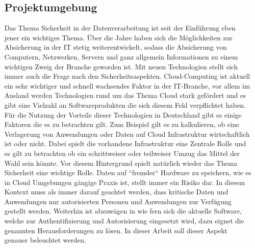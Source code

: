 \documentclass[
a4paper,   
titlepage,  
halfparskip,
12pt        
]{scrartcl}
\begin{document}
\begin{onehalfspacing}
\subsection{Projektumgebung}
Das Thema Sicherheit in der Datenverarbeitung ist seit der Einführung eben jener ein wichtiges Thema. Über die Jahre haben sich die Möglichkeiten zur Absicherung in der \ac{IT} stetig weiterentwickelt, sodass die Absicherung von Computern, Netzwerken, Servern und ganz allgemein Informationen zu einem wichtigen Zweig der Branche geworden ist. Mit neuen Technologien stellt sich immer auch die Frage nach den Sicherheitsaspekten.\newline
Cloud-Computing ist aktuell ein sehr wichtiger und schnell wachsendes Faktor in der \ac{IT}-Branche, vor allem im Ausland werden Technologien rund um das Thema Cloud stark gefördert und es gibt eine Vielzahl an Softwareprodukten die sich diesem Feld verpflichtet haben. Für die Nutzung der Vorteile dieser Technologien in Deutschland gibt es einige Faktoren die es zu betrachten gilt. Zum Beispiel gilt es zu kalkulieren, ob eine Verlagerung von Anwendungen oder Daten auf Cloud Infrastruktur wirtschaftlich ist oder nicht. Dabei spielt die vorhandene Infrastruktur eine Zentrale Rolle und es gilt zu betrachten ob ein schrittweiser oder teilweiser Umzug das Mittel der Wahl sein könnte. Vor diesem Hintergrund spielt natürlich wieder das Thema Sicherheit eine wichtige Rolle. Daten auf ``fremder`` Hardware zu speichern, wie es in Cloud Umgebungen gängige Praxis ist, stellt immer ein Risiko dar. In diesem Kontext muss als immer darauf geachtet werden, dass kritische Daten und Anwendungen nur autorisierten Personen und Anwendungen zur Verfügung gestellt werden. Weiterhin ist abzuwägen in wie fern sich die aktuelle Software, welche zur Authentifizierung und Autorisierung eingesetzt wird, dazu eignet die genannten Herausforderungen zu lösen. In dieser Arbeit soll dieser Aspekt genauer beleuchtet werden.

\end{onehalfspacing}
\end{document}
